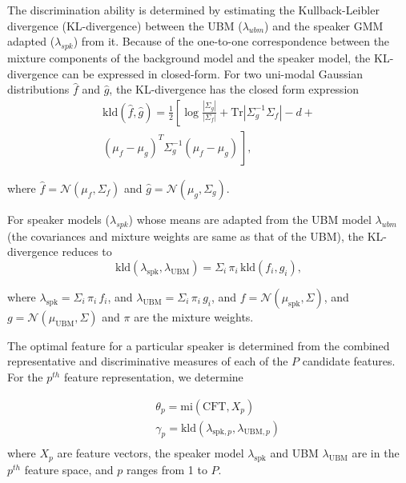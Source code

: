 \documentclass{article}
\begin{document}
The discrimination ability is determined by estimating the Kullback-Leibler divergence (KL-divergence) between the UBM ($\lambda_{ubm}$) and the speaker GMM adapted ($\lambda_{spk}$) from it. Because of the one-to-one
correspondence between the mixture components of the background model and the speaker model, the KL-divergence can be expressed in closed-form. For two uni-modal Gaussian distributions $\hat{f}$ and $\hat{g}$, the KL-divergence has the closed form expression
\begin{equation}
\begin{split}
\textrm{kld}(\hat{f},\hat{g}) = \frac{1}{2}\left[ \log \frac{|\Sigma_g|}{|\Sigma_f|} +
	\textrm{Tr}|\Sigma^{-1}_g\Sigma_f| - d + \right. \\ 
\left. (\mu_f-\mu_g)^T\Sigma_g^{-1}(\mu_f-\mu_g) \frac{}{} \right], 
\end{split}
\label{eq:kldGaussians}
\end{equation}

where $\hat{f} = \mathcal{N}(\mu_f,\Sigma_f)$ and $\hat{g} = \mathcal{N}(\mu_g,\Sigma_g)$.

For speaker models ($\lambda_{spk}$) whose means are adapted from the UBM model $\lambda_{ubm}$ (the covariances and mixture weights are same as that of the UBM), the KL-divergence reduces to 
\begin{equation}
\textrm{kld}(\lambda_{\textrm{spk}},\lambda_{\textrm{UBM}}) = 
	\Sigma_i\, \pi_i\, \textrm{kld}(f_i,g_i),
\label{eq:gmmAdaptedKLD}
\end{equation}


where $\lambda_{\textrm{spk}} = \Sigma_i \, \pi_i \, f_i$, and
$\lambda_{\textrm{UBM}} = \Sigma_i \, \pi_i \, g_i$, and
$f = \mathcal{N}(\mu_{\textrm{spk}},\Sigma)$, and
$g = \mathcal{N}(\mu_{\textrm{UBM}},\Sigma)$ and
$\pi$ are the mixture weights.


The optimal feature for a particular speaker is determined from the combined
representative and discriminative measures of each of the $P$ candidate
features. For the $p^{th}$ feature representation, we determine

\begin{eqnarray*}
&& \theta_p = \textrm{mi}(\textrm{CFT},X_{p}) \\ && \gamma_p =
\textrm{kld}(\lambda_{\textrm{spk},p},\lambda_{\textrm{UBM},p}) \\
\end{eqnarray*} 
where $X_p$ are feature vectors, the speaker model $\lambda_{\textrm{spk}}$ and 
UBM $\lambda_{\textrm{UBM}}$ are in the $p^{th}$ feature space, and $p$ ranges from 1 to $P$.
\end{document}
